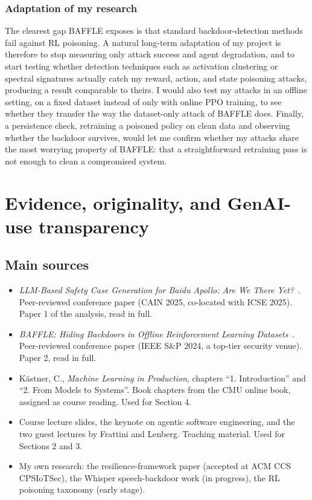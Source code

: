 \documentclass[11pt,a4paper]{article}
\begin{document}
\subsubsection{Adaptation of my research}

The clearest gap BAFFLE exposes is that standard backdoor-detection methods fail against RL poisoning. A natural long-term adaptation of my project is therefore to stop measuring only attack success and agent degradation, and to start testing whether detection techniques such as activation clustering or spectral signatures actually catch my reward, action, and state poisoning attacks, producing a result comparable to theirs. I would also test my attacks in an offline setting, on a fixed dataset instead of only with online PPO training, to see whether they transfer the way the dataset-only attack of BAFFLE does. Finally, a persistence check, retraining a poisoned policy on clean data and observing whether the backdoor survives, would let me confirm whether my attacks share the most worrying property of BAFFLE: that a straightforward retraining pass is not enough to clean a compromised system.


\section{Evidence, originality, and GenAI-use transparency}


\subsection{Main sources}

\begin{itemize}
  \itemsep0em
  \item \textit{LLM-Based Safety Case Generation for Baidu Apollo: Are We There Yet?}~\cite{odu2025safetycase}. Peer-reviewed conference paper (CAIN 2025, co-located with ICSE 2025). Paper 1 of the analysis, read in full.

  \item \textit{BAFFLE: Hiding Backdoors in Offline Reinforcement Learning Datasets}~\cite{gong2024baffle}. Peer-reviewed conference paper (IEEE S\&P 2024, a top-tier security venue). Paper 2, read in full.

  \item K\"astner, C., \textit{Machine Learning in Production}, chapters ``1. Introduction'' and ``2. From Models to Systems''. Book chapters from the CMU online book, assigned as course reading. Used for Section 4.

  \item Course lecture slides, the keynote on agentic software engineering, and the two guest lectures by Frattini and Lenberg. Teaching material. Used for Sections 2 and 3.

  \item My own research: the resilience-framework paper (accepted at ACM CCS CPSIoTSec), the Whisper speech-backdoor work (in progress), the RL poisoning taxonomy (early stage).
\end{itemize}
\end{document}
